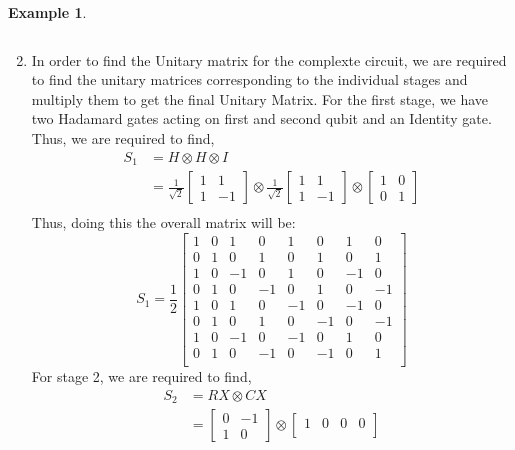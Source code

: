 \documentclass[12pt, oneside]{book}
\theoremstyle{definition}
\theoremstyle{definition}
\newtheorem{example}{Example}[section]
\theoremstyle{remark}
\begin{document}
\begin{example}
\begin{enumerate}
\[        \]
        \item In order to find the Unitary matrix for the complexte circuit, we are required to find the unitary matrices corresponding to 
        the individual stages and multiply them to get the final Unitary Matrix.
        For the first stage, we have two Hadamard gates acting on first and second qubit and an Identity gate. Thus, we are required to find,
        \begin{align*}
            S_1 &= H \otimes H \otimes I\\
            &= \frac{1}{\sqrt{2}}\begin{bmatrix} 1 & 1 \\ 1 & -1 \end{bmatrix} \otimes \frac{1}{\sqrt{2}}\begin{bmatrix} 1 & 1 \\ 1 & -1 \end{bmatrix} \otimes \begin{bmatrix} 1 & 0 \\ 0 & 1 \end{bmatrix}\\
        \end{align*}
        Thus, doing this the overall matrix will be:
        \[
            S_1 = \frac{1}{2}\begin{bmatrix}
                1 & 0 & 1 & 0 & 1 & 0 & 1 & 0 \\
                0 & 1 & 0 & 1 & 0 & 1 & 0 & 1 \\
                1 & 0 & -1 & 0 & 1 & 0 & -1 & 0 \\
                0 & 1 & 0 & -1 & 0 & 1 & 0 & -1 \\
                1 & 0 & 1 & 0 & -1 & 0 & -1 & 0 \\
                0 & 1 & 0 & 1 & 0 & -1 & 0 & -1 \\
                1 & 0 & -1 & 0 & -1 & 0 & 1 & 0 \\
                0 & 1 & 0 & -1 & 0 & -1 & 0 & 1 \\
            \end{bmatrix}
        \]
        For stage 2, we are required to find,
        \begin{align*}
            S_2 &= RX \otimes CX\\
            &= \begin{bmatrix} 0 & -1 \\ 1 & 0 \end{bmatrix} \otimes \begin{bmatrix} 1 & 0 & 0 & 0 \\

\end{bmatrix}
\end{align*}
\end{enumerate}
\end{example}
\end{document}
